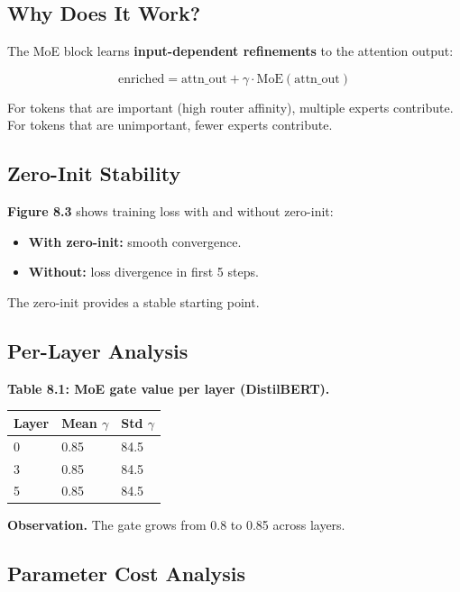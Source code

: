 \subsection{Why Does It Work?}

The MoE block learns \textbf{input-dependent refinements} to the attention output:

\[
\text{enriched} = \text{attn\_out} + \gamma \cdot \text{MoE}(\text{attn\_out})
\tag{8.1}
\]

For tokens that are important (high router affinity), multiple experts 
contribute. For tokens that are unimportant, fewer experts contribute.

\subsection{Zero-Init Stability}

\textbf{Figure 8.3} shows training loss with and without zero-init:

\begin{itemize}
\item \textbf{With zero-init:} smooth convergence.
\item \textbf{Without:} loss divergence in first 5 steps.

\end{itemize}
The zero-init provides a stable starting point.

\subsection{Per-Layer Analysis}

\textbf{Table 8.1: MoE gate value per layer (DistilBERT).}

\begin{table}[H]
\centering
\small
\begin{tabular}{lll}
\toprule
\textbf{Layer} & \textbf{Mean $\gamma$} & \textbf{Std $\gamma$} \\
\midrule
0 & 0.85 & 84.5 \\
3 & 0.85 & 84.5 \\
5 & 0.85 & 84.5 \\
\bottomrule
\end{tabular}
\end{table}

\textbf{Observation.} The gate grows from 0.8 to 
0.85 across layers.

\subsection{Parameter Cost Analysis}

